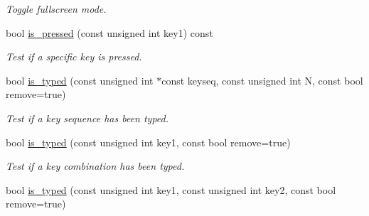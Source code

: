 \begin{DoxyCompactItemize}
\begin{DoxyCompactList}\small\item\em Toggle fullscreen mode. \item\end{DoxyCompactList}\item 
\hypertarget{structcimg__library_1_1_c_img_display_a43387d75880547848f1bbade4ad16e36}{
bool \hyperlink{structcimg__library_1_1_c_img_display_a43387d75880547848f1bbade4ad16e36}{is\_\-pressed} (const unsigned int key1) const }
\label{structcimg__library_1_1_c_img_display_a43387d75880547848f1bbade4ad16e36}

\begin{DoxyCompactList}\small\item\em Test if a specific key is pressed. \item\end{DoxyCompactList}\item 
\hypertarget{structcimg__library_1_1_c_img_display_a53e0b7615c98054860373ae0622a70c0}{
bool \hyperlink{structcimg__library_1_1_c_img_display_a53e0b7615c98054860373ae0622a70c0}{is\_\-typed} (const unsigned int $\ast$const keyseq, const unsigned int N, const bool remove=true)}
\label{structcimg__library_1_1_c_img_display_a53e0b7615c98054860373ae0622a70c0}

\begin{DoxyCompactList}\small\item\em Test if a key sequence has been typed. \item\end{DoxyCompactList}\item 
\hypertarget{structcimg__library_1_1_c_img_display_aba531d2ad3048536d89a0c0b5ab49acc}{
bool \hyperlink{structcimg__library_1_1_c_img_display_aba531d2ad3048536d89a0c0b5ab49acc}{is\_\-typed} (const unsigned int key1, const bool remove=true)}
\label{structcimg__library_1_1_c_img_display_aba531d2ad3048536d89a0c0b5ab49acc}

\begin{DoxyCompactList}\small\item\em Test if a key combination has been typed. \item\end{DoxyCompactList}\item 
\hypertarget{structcimg__library_1_1_c_img_display_ad2dba3c2fc021ced6a9118592f042c85}{
bool \hyperlink{structcimg__library_1_1_c_img_display_ad2dba3c2fc021ced6a9118592f042c85}{is\_\-typed} (const unsigned int key1, const unsigned int key2, const bool remove=true)}
\label{structcimg__library_1_1_c_img_display_ad2dba3c2fc021ced6a9118592f042c85}


\end{DoxyCompactItemize}
